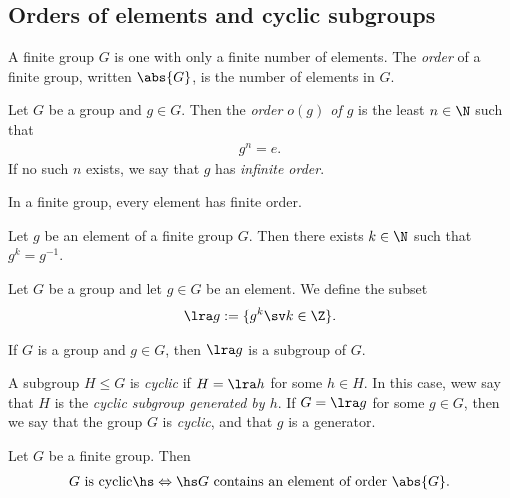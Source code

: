 \documentclass{article}
\begin{document}
\subsection{Orders of elements and cyclic subgroups}

\setcounter{theorem}{2}
\begin{definition}
	A finite group $G$ is one with only a finite number of elements.
	The \emph{order} of a finite group, written $\abs{G}$, is the
	number of elements in $G$.
\end{definition}

\begin{definition}
	Let $G$ be a group and $g\in G$. Then the \emph{order $o(g)$ of $g$}
	is the least $n\in\N$ such that
	\begin{align*}
		g^n = e.
	\end{align*}
	If no such $n$ exists, we say that $g$ has \emph{infinite order}.
\end{definition}

\setcounter{theorem}{5}
\begin{theorem}
	In a finite group, every element has finite order.
\end{theorem}

\begin{corollary}
	Let $g$ be an element of a finite group $G$. Then there exists $k\in\N$
	such that $g^k=g^{-1}$.
\end{corollary}

\begin{definition}
	Let $G$ be a group and let $g\in G$ be an element. We define the
	subset
	\begin{align*}
		\lra g := \{g^k \sv k\in\Z\}.
	\end{align*}
\end{definition}

\begin{lemma}
	If $G$ is a group and $g\in G$, then $\lra g$ is a subgroup of $G$.
\end{lemma}

\begin{definition}
	A subgroup $H\leq G$ is \emph{cyclic} if $H=\lra h$ for some
	$h\in H$. In this case, wew say that $H$ is the \emph{cyclic subgroup
		generated by $h$}. If $G=\lra g$ for some $g\in G$, then we
	say that the group $G$ is \emph{cyclic}, and that $g$ is a generator.
\end{definition}

\setcounter{theorem}{13}
\begin{lemma}
	Let $G$ be a finite group. Then
	\begin{align*}
		\text{$G$ is cyclic} \hs\Leftrightarrow\hs \text{$G$ contains an element of order $\abs{G}$}.
	\end{align*}
\end{lemma}
\end{document}
